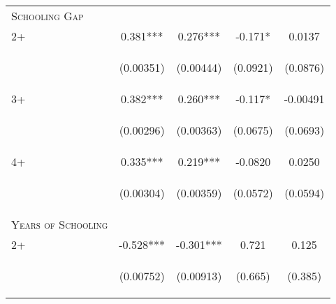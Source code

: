 \documentclass{article}[11pt,subeqn]
\begin{document}
\begin{spacing}{1.25}
\begin{table}[!htbp]
\begin{center}
\begin{tabular}{lcccc}
\midrule
\textsc{Schooling Gap} & & & &\\
2+ & 0.381*** & 0.276*** &	-0.171* & 0.0137\\
\vspace{4pt} & \begin{footnotesize}(0.00351)\end{footnotesize} & \begin{footnotesize}(0.00444)\end{footnotesize} & \begin{footnotesize}(0.0921)\end{footnotesize} & \begin{footnotesize}(0.0876)\end{footnotesize} \\
3+ & 0.382*** & 0.260*** & -0.117* & -0.00491\\
\vspace{4pt} & \begin{footnotesize}(0.00296)\end{footnotesize} & \begin{footnotesize}(0.00363)\end{footnotesize} & \begin{footnotesize}(0.0675)\end{footnotesize} & \begin{footnotesize}(0.0693)\end{footnotesize} \\
4+ & 0.335*** & 0.219*** & -0.0820 & 0.0250\\
\vspace{4pt} & \begin{footnotesize}(0.00304)\end{footnotesize} & \begin{footnotesize}(0.00359)\end{footnotesize} & \begin{footnotesize}(0.0572)\end{footnotesize} & \begin{footnotesize}(0.0594)\end{footnotesize} \\
\midrule
\textsc{Years of Schooling} & & & &\\
2+ & -0.528*** &	-0.301*** &	0.721 & 0.125\\
\vspace{4pt} & \begin{footnotesize}(0.00752)\end{footnotesize} & \begin{footnotesize}(0.00913)\end{footnotesize}  & \begin{footnotesize}(0.665)\end{footnotesize} & \begin{footnotesize}(0.385)\end{footnotesize} \\

\end{tabular}
\end{center}
\end{table}
\end{spacing}
\end{document}
